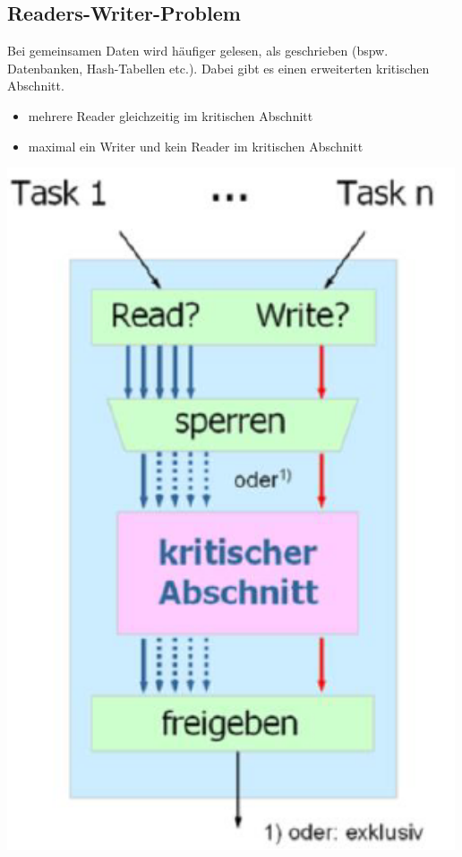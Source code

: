 \documentclass{report}
\newenvironment{Figure}
	{\par\medskip\noindent\minipage{\linewidth}}
	{\endminipage\par\medskip}
\theoremstyle{definition}
\theoremstyle{example}
\begin{document}
	\subsection{Readers-Writer-Problem}
Bei gemeinsamen Daten wird häufiger gelesen, als geschrieben (bspw. Datenbanken, Hash-Tabellen etc.). Dabei gibt es einen erweiterten kritischen Abschnitt.
\begin{itemize}
	\item mehrere Reader gleichzeitig im kritischen Abschnitt
	\item maximal ein Writer und kein Reader im kritischen Abschnitt
\end{itemize}
\begin{Figure}
\centering
\includegraphics[width=500px]{img/RW-Problem.png}
	\label{fig:Beispiel einer Lösung für das Reader-Writer-Problems}
\end{Figure}
\end{document}
